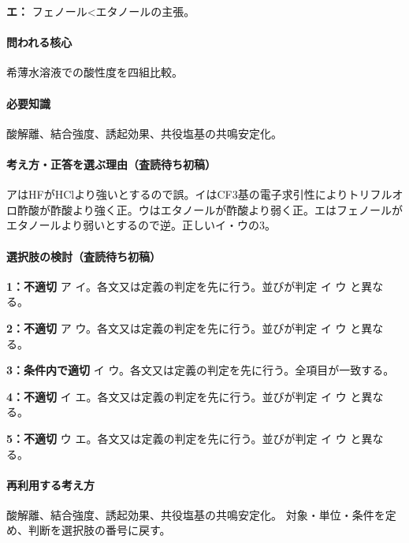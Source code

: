 \noindent\textbf{エ：} フェノール<エタノールの主張。\par

\paragraph{問われる核心} 希薄水溶液での酸性度を四組比較。

\paragraph{必要知識} 酸解離、結合強度、誘起効果、共役塩基の共鳴安定化。

\paragraph{考え方・正答を選ぶ理由（査読待ち初稿）} アはHFがHClより強いとするので誤。イはCF3基の電子求引性によりトリフルオロ酢酸が酢酸より強く正。ウはエタノールが酢酸より弱く正。エはフェノールがエタノールより弱いとするので逆。正しいイ・ウの3。

\paragraph{選択肢の検討（査読待ち初稿）}\mbox{}\par

\noindent\textbf{1：不適切} ア イ。各文又は定義の判定を先に行う。並びが判定 イ ウ と異なる。\par

\noindent\textbf{2：不適切} ア ウ。各文又は定義の判定を先に行う。並びが判定 イ ウ と異なる。\par

\noindent\textbf{3：条件内で適切} イ ウ。各文又は定義の判定を先に行う。全項目が一致する。\par

\noindent\textbf{4：不適切} イ エ。各文又は定義の判定を先に行う。並びが判定 イ ウ と異なる。\par

\noindent\textbf{5：不適切} ウ エ。各文又は定義の判定を先に行う。並びが判定 イ ウ と異なる。\par

\paragraph{再利用する考え方} 酸解離、結合強度、誘起効果、共役塩基の共鳴安定化。 対象・単位・条件を定め、判断を選択肢の番号に戻す。

